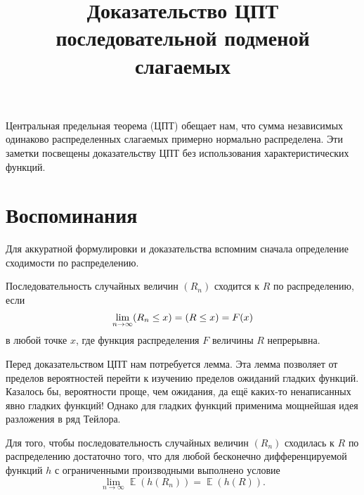 \documentclass[
  letterpaper,
  DIV=11,
  numbers=noendperiod]{scrartcl}
\title{Доказательство ЦПТ последовательной подменой слагаемых}
\author{}
\date{}
\let\P\relax
\DeclareMathOperator{\P}{\mathbb{P}}
\DeclareMathOperator{\E}{\mathbb{E}}
\renewcommand*\contentsname{Содержание}
\newcommand\contentsname{Содержание}
\begin{document}
\maketitle

\renewcommand*\contentsname{Содержание}
{
\hypersetup{linkcolor=}
\setcounter{tocdepth}{2}
\tableofcontents
}
Центральная предельная теорема (ЦПТ) обещает нам, что сумма независимых
одинаково распределенных слагаемых примерно нормально распределена. Эти
заметки посвещены доказательству ЦПТ без использования
характеристических функций.

\section{Воспоминания}\label{sec-recall}

Для аккуратной формулировки и доказательства вспомним сначала
определение сходимости по распределению.

\begin{tcolorbox}[enhanced jigsaw, titlerule=0mm, colframe=quarto-callout-note-color-frame, colback=white, coltitle=black, leftrule=.75mm, rightrule=.15mm, toprule=.15mm, left=2mm, breakable, bottomrule=.15mm, bottomtitle=1mm, toptitle=1mm, opacitybacktitle=0.6, title=\textcolor{quarto-callout-note-color}{\faInfo}\hspace{0.5em}{Сходимость по распределению}, arc=.35mm, colbacktitle=quarto-callout-note-color!10!white, opacityback=0]

Последовательность случайных величин \((R_n)\) сходится к \(R\) по
распределению, если \[
\lim_{n\to\infty} \P(R_n \leq x) = \P(R\leq x) = F(x)
\] в любой точке \(x\), где функция распределения \(F\) величины \(R\)
непрерывна.

\end{tcolorbox}

Перед доказательством ЦПТ нам потребуется лемма. Эта лемма позволяет от
пределов вероятностей перейти к изучению пределов ожиданий гладких
функций. Казалось бы, вероятности проще, чем ожидания, да ещё каких-то
ненаписанных явно гладких функций! Однако для гладких функций применима
мощнейшая идея разложения в ряд Тейлора.

\begin{tcolorbox}[enhanced jigsaw, titlerule=0mm, colframe=quarto-callout-note-color-frame, colback=white, coltitle=black, leftrule=.75mm, rightrule=.15mm, toprule=.15mm, left=2mm, breakable, bottomrule=.15mm, bottomtitle=1mm, toptitle=1mm, opacitybacktitle=0.6, title=\textcolor{quarto-callout-note-color}{\faInfo}\hspace{0.5em}{Лемма}, arc=.35mm, colbacktitle=quarto-callout-note-color!10!white, opacityback=0]

Для того, чтобы последовательность случайных величин \((R_n)\) сходилась
к \(R\) по распределению достаточно того, что для любой бесконечно
дифференцируемой функций \(h\) с ограниченными производными выполнено
условие \[
\lim_{n\to\infty} \E(h(R_n)) = \E(h(R)).
\]

\end{tcolorbox}
\end{document}
